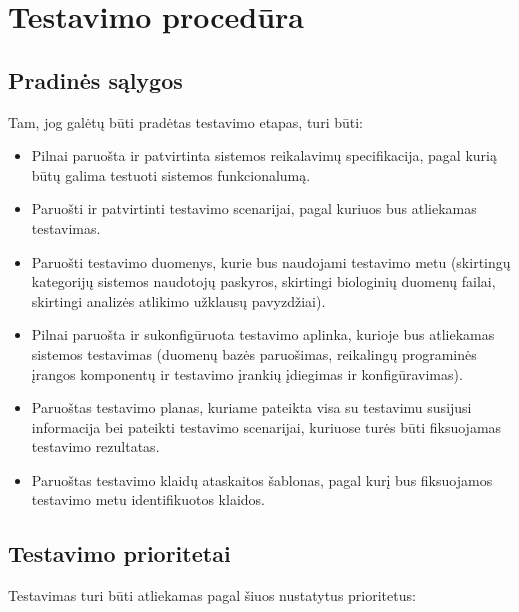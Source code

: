 \documentclass[12pt]{article}
\begin{document}
\newpage

\section{Testavimo procedūra}
\subsection{Pradinės sąlygos}
Tam, jog galėtų būti pradėtas testavimo etapas, turi būti:

\begin{itemize}
    \item Pilnai paruošta ir patvirtinta sistemos reikalavimų specifikacija,
    pagal kurią būtų galima testuoti sistemos funkcionalumą.
    \item Paruošti ir patvirtinti testavimo scenarijai, pagal kuriuos bus
    atliekamas testavimas.
    \item Paruošti testavimo duomenys, kurie bus naudojami testavimo metu
    (skirtingų kategorijų sistemos naudotojų paskyros, skirtingi biologinių
    duomenų failai, skirtingi analizės atlikimo užklausų pavyzdžiai).
    \item Pilnai paruošta ir sukonfigūruota testavimo aplinka, kurioje bus
    atliekamas sistemos testavimas (duomenų bazės paruošimas, reikalingų
    programinės įrangos komponentų ir testavimo įrankių įdiegimas ir
    konfigūravimas).
    \item Paruoštas testavimo planas, kuriame pateikta visa su testavimu
    susijusi informacija bei pateikti testavimo scenarijai, kuriuose turės būti
    fiksuojamas testavimo rezultatas.
    \item Paruoštas testavimo klaidų ataskaitos šablonas, pagal kurį bus
    fiksuojamos testavimo metu identifikuotos klaidos.
\end{itemize}

\subsection{Testavimo prioritetai}
Testavimas turi būti atliekamas pagal šiuos nustatytus prioritetus:
\end{document}
